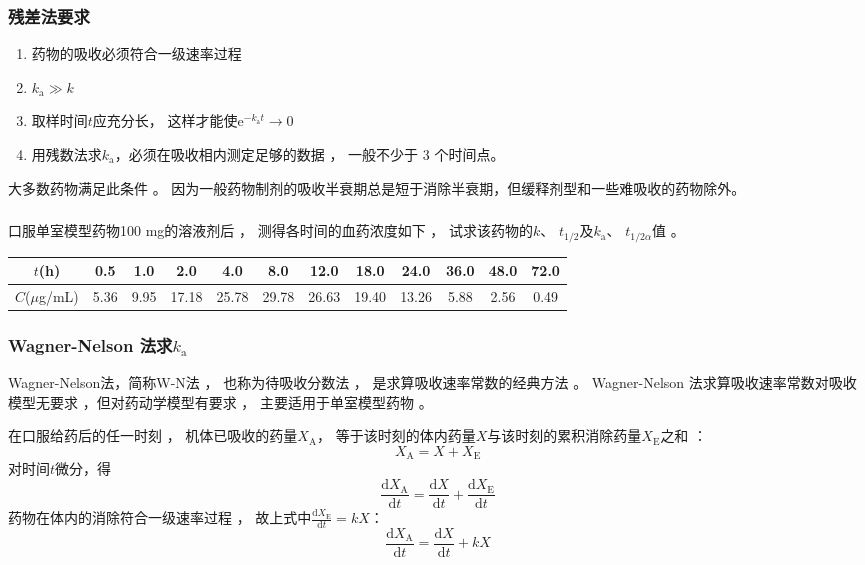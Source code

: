 \documentclass[dvipsnames, svgnames, x11names]{beamer}
\begin{document}
\begin{frame}
    \frametitle{残差法要求}
    \begin{enumerate}
      \item 药物的吸收必须符合一级速率过程
      \item $k_\mathrm{a}\gg k$
      \item 取样时间$t$应充分长， 这样才能使$\mathrm{e}^{-k_\mathrm{a}t}\to 0$
      \item 用残数法求$k_{\mathrm{a}}$，必须在吸收相内测定足够的数据 ， 一般不少于 3 个时间点。
    \end{enumerate}
    \begin{blankblock}{}
        大多数药物满足此条件 。 因为一般药物制剂的吸收半衰期总是短于消除半衰期，但缓释剂型和一些难吸收的药物除外。
    \end{blankblock}
\end{frame}


\begin{frame}[t]
    \frametitle{}
    \begin{example}
        口服单室模型药物100 mg的溶液剂后 ， 测得各时间的血药浓度如下 ， 试求该药物的$k$、 $t_{1/2}$及$k_\mathrm{a}$、 $t_{1/2\alpha}$值 。
        \begin{table}
            \centering
            \small
            \begin{tabular}{cccccccccccc}
                \bottomrule
                $t$(h) & 0.5 & 1.0 & 2.0 & 4.0 & 8.0 & 12.0 & 18.0 & 24.0 & 36.0 & 48.0 & 72.0 \hspace{-9pt} \\ \hline
                $C$($\mu$g/mL) & 5.36 & 9.95 & 17.18 & 25.78 & 29.78 & 26.63 & 19.40 & 13.26 & 5.88 & 2.56 & 0.49 \hspace{-9pt} \\ \toprule 
            \end{tabular}
        \end{table}
    \end{example}
\end{frame}


\begin{frame}
    \frametitle{Wagner-Nelson 法求$k_\mathrm{a}$}
    Wagner-Nelson法，简称W-N法 ， 也称为待吸收分数法 ， 是求算吸收速率常数的经典方法 。 Wagner-Nelson 法求算吸收速率常数对吸收模型无要求 ，但对药动学模型有要求 ， 主要适用于单室模型药物 。 

    在口服给药后的任一时刻 ， 机体已吸收的药量$X_\mathrm{A}$， 等于该时刻的体内药量$X$与该时刻的累积消除药量$X_\mathrm{E}$之和 ：
    \[
        X_\mathrm{A} = X + X_\mathrm{E}
    \]
    对时间$t$微分，得
    \[
        \frac{\mathrm{d}X_{\mathrm{A}}}{\mathrm{d}t}=\frac{\mathrm{d}X}{\mathrm{d}t}+\frac{\mathrm{d}X_{\mathrm{E}}}{\mathrm{d}t}
    \]
    药物在体内的消除符合一级速率过程 ， 故上式中$\frac{\mathrm{d}X_{\mathrm{E}}}{\mathrm{d}t}=kX$：
    \[
        \frac{\mathrm{d}X_{\mathrm{A}}}{\mathrm{d}t}=\frac{\mathrm{d}X}{\mathrm{d}t}+kX
    \]
\end{frame}
\end{document}
